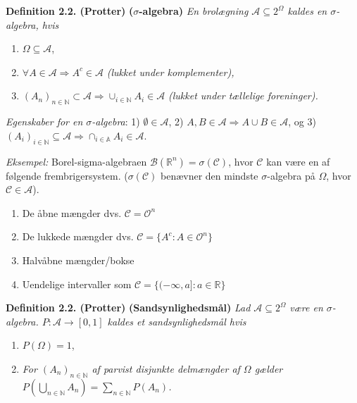 \documentclass[a4paper,10pt,openany]{book}
\providecommand{\tightlist}{%
 \setlength{\itemsep}{0pt}\setlength{\parskip}{0pt}}
\begin{document}
\textbf{Definition 2.2. (Protter)} \textbf{(\(\mathit{\sigma}\)-algebra)} \emph{En brolægning \(\mathcal{A}\subseteq 2^\Omega\) kaldes en \(\sigma\)-algebra, hvis}

\begin{enumerate}
\def\labelenumi{\arabic{enumi}.}
\tightlist
\item
  \(\Omega\subseteq\mathcal{A}\),
\item
  \(\forall A\in\mathcal{A} \Rightarrow A^c\in\mathcal{A}\) \emph{(lukket under komplementer),}
\item
  \((A_n)_{n\in\mathbb{N}}\subset\mathcal{A}\Rightarrow \cup_{i\in\mathbb{N}} A_i\in\mathcal{A}\) \emph{(lukket under tællelige foreninger).}
\end{enumerate}

\emph{Egenskaber for en \(\sigma\)-algebra}: 1) \(\emptyset\in\mathcal{A}\), 2) \(A,B\in\mathcal{A}\Rightarrow A \cup B\in\mathcal{A}\), og 3) \((A_i)_{i\in\mathbb{N}}\subseteq\mathcal{A}\Rightarrow\cap_{i\in\mathbb{A}}A_i\in\mathcal{A}\).

\emph{Eksempel:} Borel-sigma-algebraen \(\mathcal{B}(\mathbb{R}^n)=\sigma(\mathcal{C})\), hvor \(\mathcal{C}\) kan være en af følgende frembrigersystem. (\(\sigma(\mathcal{C})\) benævner den mindste \(\sigma\)-algebra på \(\Omega\), hvor \(\mathcal{C}\in\mathcal{A}\)).

\begin{enumerate}
\def\labelenumi{\roman{enumi}.}
\tightlist
\item
  De åbne mængder dvs. \(\mathcal{C}=\mathcal{O}^n\)
\item
  De lukkede mængder dvs. \(\mathcal{C}=\{A^c : A\in\mathcal{O}^n\}\)
\item
  Halvåbne mængder/bokse
\item
  Uendelige intervaller som \(\mathcal{C}=\{(-\infty,a] : a\in\mathbb{R}\}\)
\end{enumerate}

\textbf{Definition 2.2. (Protter)} \textbf{(Sandsynlighedsmål)} \emph{Lad \(\mathcal{A}\subseteq2^\Omega\) være en \(\sigma\)-algebra. \(P : \mathcal{A}\to[0,1]\) kaldes et sandsynlighedsmål hvis}

\begin{enumerate}
\def\labelenumi{\arabic{enumi}.}
\tightlist
\item
  \(P(\Omega)=1\),
\item
  \emph{For \((A_n)_{n\in\mathbb{N}}\) af parvist disjunkte delmængder af \(\Omega\) gælder \(P\left(\bigcup_{n\in\mathbb{N}}A_n\right)=\sum_{n\in\mathbb{N}}P(A_n)\).}
\end{enumerate}
\end{document}
